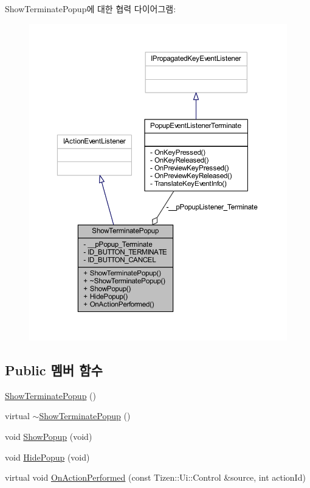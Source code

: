 Show\+Terminate\+Popup에 대한 협력 다이어그램\+:
\nopagebreak
\begin{figure}[H]
\begin{center}
\leavevmode
\includegraphics[width=350pt]{class_show_terminate_popup__coll__graph}
\end{center}
\end{figure}
\subsection*{Public 멤버 함수}
\begin{DoxyCompactItemize}
\item 
\hyperlink{class_show_terminate_popup_a14eb0658bb0fff03c7a058c6586f5920}{Show\+Terminate\+Popup} ()
\item 
virtual \hyperlink{class_show_terminate_popup_a55c032fb7df7fea00e46236aeb45cb45}{$\sim$\+Show\+Terminate\+Popup} ()
\item 
void \hyperlink{class_show_terminate_popup_aa3424f6b23949489b0e3f674ec9c7c1c}{Show\+Popup} (void)
\item 
void \hyperlink{class_show_terminate_popup_a274ce99f5c39a6a447edde1ccb4d3b0e}{Hide\+Popup} (void)
\item 
virtual void \hyperlink{class_show_terminate_popup_aa2517f162e3848693e811b9da36a6e89}{On\+Action\+Performed} (const Tizen\+::\+Ui\+::\+Control \&source, int action\+Id)
\end{DoxyCompactItemize}
